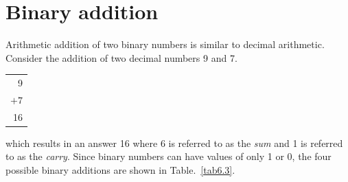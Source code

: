 \eject

\section{Binary addition}\label{sec6.8}

Arithmetic addition of two binary numbers is similar to decimal arithmetic. Consider the addition of two decimal numbers 9 and 7.
\begin{center}
\begin{tabular}{r}
9\\
$+7$\\
\hline
16
\end{tabular}
\end{center}
which results in an answer 16 where 6 is referred to as the {\em sum} and 1 is referred to as the {\em carry}. Since binary numbers can have values of only 1 or 0, the four possible binary additions are shown in Table.~\ref{tab6.3}.
